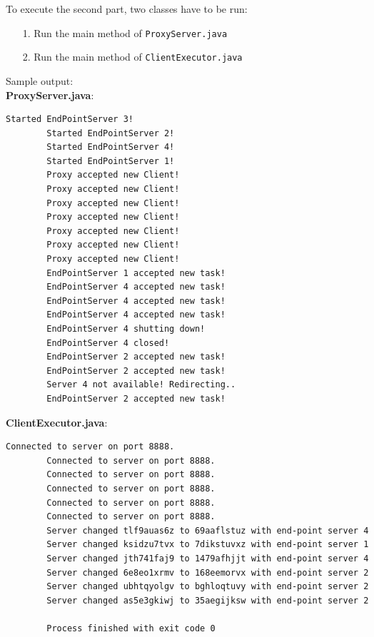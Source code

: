 \documentclass{article}
\begin{document}
      To execute the second part, two classes have to be run:
      \begin{itemize}
      	\item[1.] Run the main method of \texttt{ProxyServer.java}
      	\item[2.] Run the main method of \texttt{ClientExecutor.java}
      \end{itemize}
      Sample output:\\
      \textbf{ProxyServer.java}:\\
      \begin{lstlisting}[language=sh]
        Started EndPointServer 3!
        Started EndPointServer 2!
        Started EndPointServer 4!
        Started EndPointServer 1!
        Proxy accepted new Client!
        Proxy accepted new Client!
        Proxy accepted new Client!
        Proxy accepted new Client!
        Proxy accepted new Client!
        Proxy accepted new Client!
        Proxy accepted new Client!
        EndPointServer 1 accepted new task!
        EndPointServer 4 accepted new task!
        EndPointServer 4 accepted new task!
        EndPointServer 4 accepted new task!
        EndPointServer 4 shutting down!
        EndPointServer 4 closed!
        EndPointServer 2 accepted new task!
        EndPointServer 2 accepted new task!
        Server 4 not available! Redirecting..
        EndPointServer 2 accepted new task!
      \end{lstlisting}
      \textbf{ClientExecutor.java}:\\
      \begin{lstlisting}[language=sh]
        Connected to server on port 8888.
        Connected to server on port 8888.
        Connected to server on port 8888.
        Connected to server on port 8888.
        Connected to server on port 8888.
        Connected to server on port 8888.
        Server changed tlf9auas6z to 69aaflstuz with end-point server 4
        Server changed ksidzu7tvx to 7dikstuvxz with end-point server 1
        Server changed jth741faj9 to 1479afhjjt with end-point server 4
        Server changed 6e8eo1xrmv to 168eemorvx with end-point server 2
        Server changed ubhtqyolgv to bghloqtuvy with end-point server 2
        Server changed as5e3gkiwj to 35aegijksw with end-point server 2
        
        Process finished with exit code 0
      \end{lstlisting}
	
\end{document}
